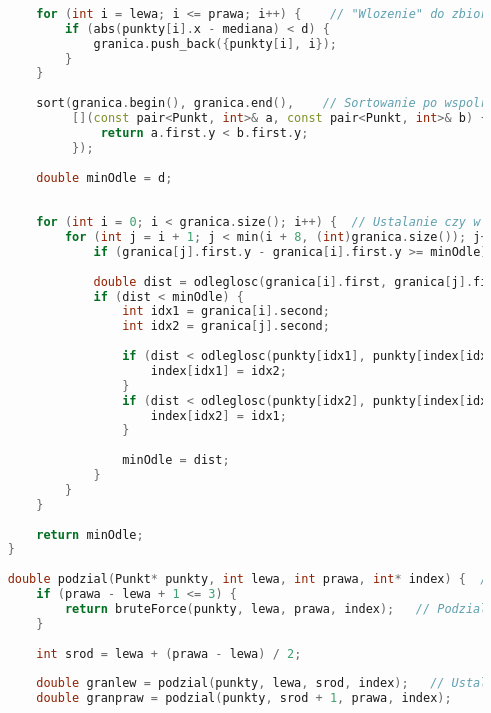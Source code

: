 \documentclass[12pt,twoside]{article}
\begin{document}
\begin{lstlisting}[language=C++,caption=Kod Dziel i Zwyciężaj,label={dividekod}]
    
        for (int i = lewa; i <= prawa; i++) {    // "Wlozenie" do zbioru granica punktow ktore sie kwalifikuja na potencjalnie blizsze po drugiej stronie tej granicy
            if (abs(punkty[i].x - mediana) < d) {
                granica.push_back({punkty[i], i});
            }
        }
    
        sort(granica.begin(), granica.end(),    // Sortowanie po wspolrzednych Y zbioru granica
             [](const pair<Punkt, int>& a, const pair<Punkt, int>& b) {
                 return a.first.y < b.first.y;
             });
    
        double minOdle = d;
        
    
        for (int i = 0; i < granica.size(); i++) {  // Ustalanie czy w zbiorze granica sa punkty blizsze niz ustalone wczesniej
            for (int j = i + 1; j < min(i + 8, (int)granica.size()); j++) {   // Skorzystanie z dowodu geometrycznego na to, ze nie moze byc wiecej niz 7 punktow ktore sa potencjalnie blizsze
                if (granica[j].first.y - granica[i].first.y >= minOdle) break; 
                
                double dist = odleglosc(granica[i].first, granica[j].first);
                if (dist < minOdle) {
                    int idx1 = granica[i].second;
                    int idx2 = granica[j].second;
                    
                    if (dist < odleglosc(punkty[idx1], punkty[index[idx1]])) {  // Podmienianie indeksow w tablicy wynikowej index jesli zachodzi taka potrzeba
                        index[idx1] = idx2;
                    }
                    if (dist < odleglosc(punkty[idx2], punkty[index[idx2]])) {
                        index[idx2] = idx1;
                    }
                    
                    minOdle = dist;
                }
            }
        }
        
        return minOdle;
    }
    
    double podzial(Punkt* punkty, int lewa, int prawa, int* index) {  // Funkcja odpowiedzialna za podzial zbioru danych na mniejsze
        if (prawa - lewa + 1 <= 3) {
            return bruteForce(punkty, lewa, prawa, index);   // Podzial dokonuje sie az osiagniemy zbiory o ilosci elementow 3 i mniej
        }
        
        int srod = lewa + (prawa - lewa) / 2;
        
        double granlew = podzial(punkty, lewa, srod, index);   // Ustalenie granic
        double granpraw = podzial(punkty, srod + 1, prawa, index);
        

\end{lstlisting}
\end{document}
